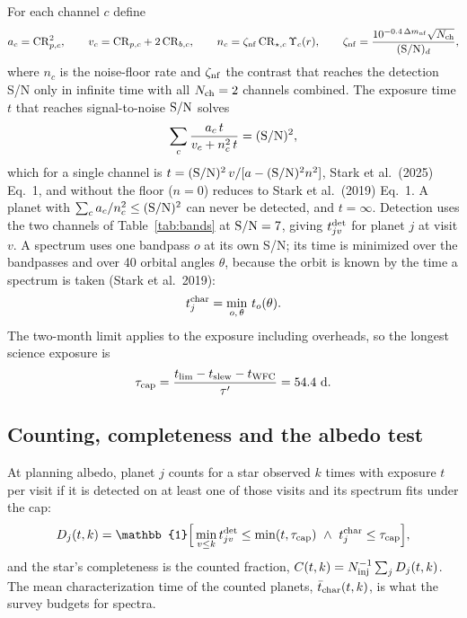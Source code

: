 \documentclass[11pt,a4paper]{article}
\begin{document}
For each channel $c$ define
\[
a_c = \mathrm{CR}_{p,c}^2, \qquad v_c = \mathrm{CR}_{p,c} + 2\,\mathrm{CR}_{b,c}, \qquad
n_c = \zeta_{\rm nf}\,\mathrm{CR}_{\star,c}\,\Upsilon_c(r), \qquad
\zeta_{\rm nf} = \frac{10^{-0.4\,\Delta m_{\rm nf}}\sqrt{N_{\rm ch}}}{({\rm S/N})_d},
\]
where $n_c$ is the noise-floor rate and $\zeta_{\rm nf}$ the contrast that reaches the detection S/N only in infinite time with all $N_{\rm ch} = 2$
channels combined. The
exposure time $t$ that reaches signal-to-noise ${\rm S/N}$ solves
\begin{equation}
\sum_c \frac{a_c\,t}{v_c + n_c^2\,t} = ({\rm S/N})^2,
\label{eq:exptime}
\end{equation}
which for a single channel is
$t = ({\rm S/N})^2\,v/[a - ({\rm S/N})^2 n^2]$, Stark et al.\ (2025) Eq.~1, and without the
floor ($n = 0$) reduces to Stark et al.\ (2019) Eq.~1. A planet with
$\sum_c a_c/n_c^2 \le ({\rm S/N})^2$ can never be detected, and $t = \infty$. Detection uses the
two channels of Table~\ref{tab:bands} at ${\rm S/N} = 7$, giving $t^{\rm det}_{jv}$ for planet $j$
at visit $v$. A spectrum uses one bandpass $o$ at its own S/N; its time is minimized over the
bandpasses and over 40 orbital angles $\theta$, because the orbit is known by the time a spectrum
is taken (Stark et al.\ 2019):
\begin{equation}
t^{\rm char}_j = \min_{o,\,\theta}\,t_o(\theta).
\label{eq:tchar}
\end{equation}
The two-month limit applies to the exposure including overheads, so the longest science exposure
is
\begin{equation}
\tau_{\rm cap} = \frac{t_{\rm lim} - t_{\rm slew} - t_{\rm WFC}}{\tau'} = 54.4\ {\rm d}.
\label{eq:cap}
\end{equation}

\subsection{Counting, completeness and the albedo test}
\label{sec:counting}

At planning albedo, planet $j$ counts for a star observed $k$ times with exposure $t$ per visit if
it is detected on at least one of those visits and its spectrum fits under the cap:
\begin{equation}
D_j(t, k) = \mathbb{1}\Big[\min_{v \le k} t^{\rm det}_{jv} \le \min(t, \tau_{\rm cap})\ \wedge\
t^{\rm char}_j \le \tau_{\rm cap}\Big],
\label{eq:counted}
\end{equation}
and the star's completeness is the counted fraction,
$C(t, k) = N_{\rm inj}^{-1}\sum_j D_j(t, k)$. The mean characterization time of the counted
planets, $\bar t_{\rm char}(t, k)$, is what the survey budgets for spectra.
\end{document}
